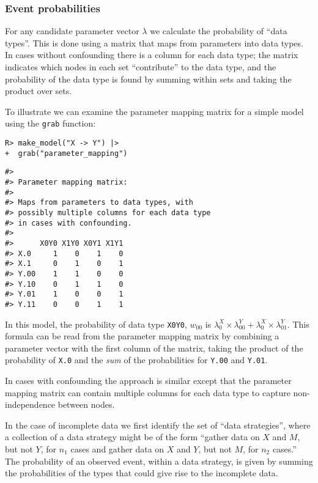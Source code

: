 \documentclass[
  11pt,
  article]{jss}
\begin{document}
\hypertarget{event-probabilities}{%
\subsubsection{Event probabilities}\label{event-probabilities}}

For any candidate parameter vector \(\lambda\) we calculate the
probability of ``data types''. This is done using a matrix that maps
from parameters into data types. In cases without confounding there is a
column for each data type; the matrix indicates which nodes in each set
``contribute'' to the data type, and the probability of the data type is
found by summing within sets and taking the product over sets.

To illustrate we can examine the parameter mapping matrix for a simple
model using the \texttt{grab} function:

\begin{verbatim}
R> make_model("X -> Y") |> 
+  grab("parameter_mapping") 
\end{verbatim}

\begin{verbatim}
#> 
#> Parameter mapping matrix: 
#> 
#> Maps from parameters to data types, with 
#> possibly multiple columns for each data type 
#> in cases with confounding. 
#> 
#>      X0Y0 X1Y0 X0Y1 X1Y1
#> X.0     1    0    1    0
#> X.1     0    1    0    1
#> Y.00    1    1    0    0
#> Y.10    0    1    1    0
#> Y.01    1    0    0    1
#> Y.11    0    0    1    1
\end{verbatim}

In this model, the probability of data type \texttt{X0Y0}, \(w_{00}\) is
\(\lambda^X_0\times \lambda^Y_{00} + \lambda^X_0\times \lambda^Y_{01}\).
This formula can be read from the parameter mapping matrix by combining
a parameter vector with the first column of the matrix, taking the
product of the probability of \texttt{X.0} and the \emph{sum} of the
probabilities for \texttt{Y.00} and \texttt{Y.01}.

In cases with confounding the approach is similar except that the
parameter mapping matrix can contain multiple columns for each data type
to capture non-independence between nodes.

In the case of incomplete data we first identify the set of ``data
strategies'', where a collection of a data strategy might be of the form
``gather data on \(X\) and \(M\), but not \(Y\), for \(n_1\) cases and
gather data on \(X\) and \(Y\), but not \(M\), for \(n_2\) cases.'' The
probability of an observed event, within a data strategy, is given by
summing the probabilities of the types that could give rise to the
incomplete data.
\end{document}
